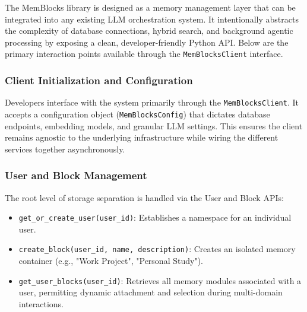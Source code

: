 \documentclass[12pt,a4paper]{article}
\begin{document}
The MemBlocks library is designed as a memory management layer that can be integrated into any existing LLM orchestration system. It intentionally abstracts the complexity of database connections, hybrid search, and background agentic processing by exposing a clean, developer-friendly Python API. Below are the primary interaction points available through the \texttt{MemBlocksClient} interface.

\subsubsection{Client Initialization and Configuration}
Developers interface with the system primarily through the \texttt{MemBlocksClient}. It accepts a configuration object (\texttt{MemBlocksConfig}) that dictates database endpoints, embedding models, and granular LLM settings. This ensures the client remains agnostic to the underlying infrastructure while wiring the different services together asynchronously.

\subsubsection{User and Block Management}
The root level of storage separation is handled via the User and Block APIs:
\begin{itemize}
    \item \texttt{get\_or\_create\_user(user\_id)}: Establishes a namespace for an individual user.
    \item \texttt{create\_block(user\_id, name, description)}: Creates an isolated memory container (e.g., "Work Project", "Personal Study").
    \item \texttt{get\_user\_blocks(user\_id)}: Retrieves all memory modules associated with a user, permitting dynamic attachment and selection during multi-domain interactions.
\end{itemize}
\end{document}
